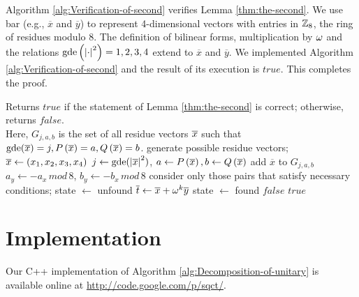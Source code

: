 \documentclass[english,journal]{extarticle}
\makeatletter
\theoremstyle{plain}
\theoremstyle{plain}
\theoremstyle{plain}
\theoremstyle{definition}
\theoremstyle{plain}
\newenvironment{proof}[1][\proofname]{\par
     \normalfont\topsep6\p@\@plus6\p@\relax
     \trivlist
     \itemindent\parindent
     \item[\hskip\labelsep
           \scshape
       #1]\ignorespaces
   }{%
     \endtrivlist\@endpefalse
   }
\providecommand{\proofname}{Proof}
\theoremstyle{plain}
\makeatother
\begin{document}
\begin{proof}
Algorithm \ref{alg:Verification-of-second} verifies Lemma \ref{thm:the-second}.
We use bar (e.g., $\overline{x}$ and $\overline{y}$) to represent 4-dimensional vectors with entries in $\mathbb{Z}_{8}$, the ring of residues
modulo $8$.  The definition of bilinear forms, multiplication by $\omega$
and the relations $\mathbf{\mathrm{gde}}\left(\left|\cdot\right|^{2}\right)=1,2,3,4$ extend to
$\overline{x}$ and $\overline{y}$.  We implemented Algorithm \ref{alg:Verification-of-second} 
and the result of its execution is $true$.  This completes the proof.
\end{proof}

\begin{algorithm}[H]
\begin{algorithmic}
\Ensure Returns $true$ if the statement of Lemma \ref{thm:the-second} is correct; otherwise, returns $false$. \\
\Comment Here, $G_{j,a,b}$ is the set of all residue vectors $\overline{x}$ such that $\mathbf{\mathrm{gde}}(\overline{x})=j,P\left(\overline{x}\right)=a,Q\left(\overline{x}\right) =b$.
 \Comment generate possible
residue vectors;
	\State $\overline{x}\leftarrow(x_1,x_2,x_3,x_4)$
	\State $j\leftarrow \mathbf{\mathrm{gde}}(\left|\overline{x}\right|^{2})$, $a\leftarrow
P\left(\overline{x}\right), b\leftarrow Q\left(\overline{x}\right)$
		\State add $\overline{x}$ to $G_{j,a,b}$ 
	\EndIf
\EndFor
{}
	\State $a_y \leftarrow -a_x\,mod\,8$, $b_y \leftarrow -b_x\,mod\,8$ 
\Comment consider only those pairs that
	 \Comment
satisfy necessary conditions;
			\State state $\leftarrow$ unfound
				\State $\overline{t} \leftarrow \overline{x} + \omega^k\overline{y}$
					\State state $\leftarrow$ found
				\EndIf
			\EndFor
				\State \Return $false$
			\EndIf
		\EndFor
	\EndFor
\EndFor
\State \Return $true$
\end{algorithmic}
\caption{\label{alg:Verification-of-second}Verification of Lemma \ref{thm:the-second}.}
\end{algorithm}


\section{Implementation}
Our C++ implementation of Algorithm \ref{alg:Decomposition-of-unitary} is available online at \url{http://code.google.com/p/sqct/}.
\end{document}
